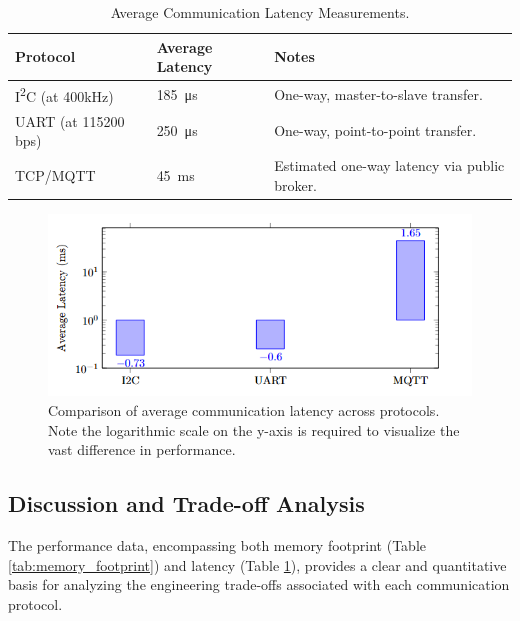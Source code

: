     \begin{table}[htb]
    \centering
    \caption{Average Communication Latency Measurements.}
    \label{tab:latency_results}
    \begin{tabular}{l l l}
    \toprule
    \textbf{Protocol} & \textbf{Average Latency} & \textbf{Notes} \\
    \midrule
    I\textsuperscript{2}C (at 400kHz) & \SI{185}{\micro\second} & One-way, master-to-slave transfer. \\
    UART (at 115200 bps) & \SI{250}{\micro\second} & One-way, point-to-point transfer. \\
    TCP/MQTT & \SI{45}{\milli\second} & Estimated one-way latency via public broker. \\
    \bottomrule
    \end{tabular}
    \end{table}

    \begin{figure}[htb!]
        \centering
        \includegraphics[width=0.9\columnwidth]{Chapters/Figures/averageLant.png}
        \caption{Comparison of average communication latency across protocols. Note the logarithmic scale on the y-axis is required to visualize the vast difference in performance.}
        \label{fig:latency_chart}
    \end{figure}


\subsection{Discussion and Trade-off Analysis}
\label{subsec:discussion}

The performance data, encompassing both memory footprint (Table \ref{tab:memory_footprint}) and latency (Table \ref{tab:latency_results}), provides a clear and quantitative basis for analyzing the engineering trade-offs associated with each communication protocol.

